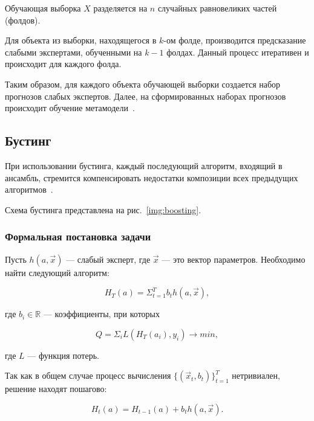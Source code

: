 
Обучающая выборка $X$ разделяется на $n$ случайных равновеликих частей (фолдов).

Для объекта из выборки, находящегося в $k$-ом фолде, производится предсказание слабыми экспертами, обученными на $k-1$ фолдах. Данный процесс итеративен и происходит для каждого фолда.

Таким образом, для каждого объекта обучающей выборки создается набор прогнозов слабых экспертов. Далее, на сформированных наборах прогнозов происходит обучение метамодели~\cite{ensembles}.

\subsection{Бустинг}

При использовании бустинга, каждый последующий алгоритм, входящий в ансамбль, стремится компенсировать недостатки композиции всех предыдущих алгоритмов~\cite{ensembles}.

Схема бустинга представлена на рис.~\ref{img:boosting}.


\subsubsection*{Формальная постановка задачи}

Пусть $h(a, \overrightarrow{x})$ --- слабый эксперт, где $\overrightarrow{x}$ --- это вектор параметров. Необходимо найти следующий алгоритм:

\begin{equation}
H_T(a) = \Sigma_{t=1}^T b_th(a, \overrightarrow{x}),
\end{equation}

где $b_i \in \mathbb{R}$ --- коэффициенты, при которых

\begin{equation}
Q = \Sigma_iL(H_T(a_i), y_i) \to min,
\end{equation}

где $L$ --- функция потерь. 

Так как в общем случае процесс вычисления $\{(\overrightarrow{x}_t, b_t)\}_{t=1}^T$ нетривиален, решение находят пошагово:

\begin{equation}
H_t(a) = H_{t-1}(a) + b_th(a, \overrightarrow{x}).
\end{equation}

